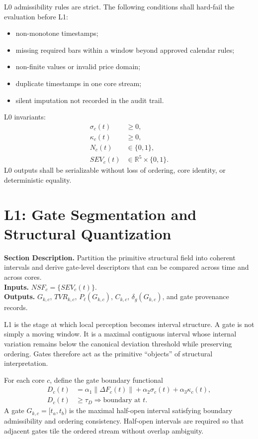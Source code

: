 \documentclass[11pt]{report}
\newcommand{\meta}[3]{\textbf{Section Description.} #1\\
\textbf{Inputs.} #2\\
\textbf{Outputs.} #3\par}
\begin{document}
L0 admissibility rules are strict. The following conditions shall hard-fail the evaluation before L1:
\begin{itemize}
    \item non-monotone timestamps;
    \item missing required bars within a window beyond approved calendar rules;
    \item non-finite values or invalid price domain;
    \item duplicate timestamps in one core stream;
    \item silent imputation not recorded in the audit trail.
\end{itemize}

L0 invariants:
\begin{align*}
\sigma_c(t) &\ge 0,\\
\kappa_c(t) &\ge 0,\\
N_c(t) &\in \{0,1\},\\
SEV_c(t) &\in \mathbb{R}^5\times\{0,1\}.
\end{align*}
L0 outputs shall be serializable without loss of ordering, core identity, or deterministic equality.

\section{L1: Gate Segmentation and Structural Quantization}
\meta{Partition the primitive structural field into coherent intervals and derive gate-level descriptors that can be compared across time and across cores.}{$NSF_c=\{SEV_c(t)\}$.}{$G_{k,c}$, $TVR_{k,c}$, $P_\ell(G_{k,c})$, $C_{k,c}$, $\delta_g(G_{k,c})$, and gate provenance records.}

L1 is the stage at which local perception becomes interval structure. A gate is not simply a moving window. It is a maximal contiguous interval whose internal variation remains below the canonical deviation threshold while preserving ordering. Gates therefore act as the primitive ``objects'' of structural interpretation.

For each core $c$, define the gate boundary functional
\begin{align*}
D_c(t) &= \alpha_1\lVert\Delta F_c(t)\rVert + \alpha_2\sigma_c(t) + \alpha_3\kappa_c(t),\\
D_c(t) &\ge \tau_D \Rightarrow \text{boundary at } t.
\end{align*}
A gate $G_{k,c}=[t_a,t_b)$ is the maximal half-open interval satisfying boundary admissibility and ordering consistency. Half-open intervals are required so that adjacent gates tile the ordered stream without overlap ambiguity.
\end{document}
